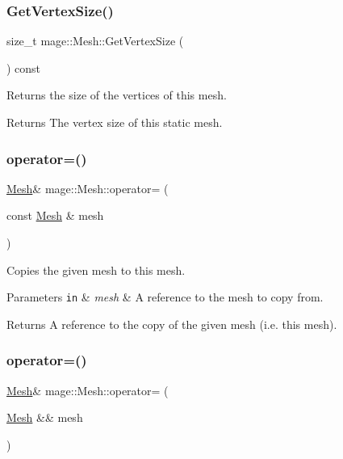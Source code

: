 \subsubsection{\texorpdfstring{Get\+Vertex\+Size()}{GetVertexSize()}}
{\footnotesize\ttfamily size\+\_\+t mage\+::\+Mesh\+::\+Get\+Vertex\+Size (\begin{DoxyParamCaption}{ }\end{DoxyParamCaption}) const}

Returns the size of the vertices of this mesh.

\begin{DoxyReturn}{Returns}
The vertex size of this static mesh. 
\end{DoxyReturn}
\hypertarget{classmage_1_1_mesh_a5baf961af32b379671a59a082492bc5e}{}\label{classmage_1_1_mesh_a5baf961af32b379671a59a082492bc5e} 
\subsubsection{\texorpdfstring{operator=()}{operator=()}\hspace{0.1cm}{\footnotesize\ttfamily [1/2]}}
{\footnotesize\ttfamily \hyperlink{classmage_1_1_mesh}{Mesh}\& mage\+::\+Mesh\+::operator= (\begin{DoxyParamCaption}\item[{const \hyperlink{classmage_1_1_mesh}{Mesh} \&}]{mesh }\end{DoxyParamCaption})\hspace{0.3cm}{\ttfamily [delete]}}

Copies the given mesh to this mesh.


\begin{DoxyParams}[1]{Parameters}
\mbox{\tt in}  & {\em mesh} & A reference to the mesh to copy from. \\
\hline
\end{DoxyParams}
\begin{DoxyReturn}{Returns}
A reference to the copy of the given mesh (i.\+e. this mesh). 
\end{DoxyReturn}
\hypertarget{classmage_1_1_mesh_a28e437196db171b2df1c4bcf3df07a63}{}\label{classmage_1_1_mesh_a28e437196db171b2df1c4bcf3df07a63} 
\subsubsection{\texorpdfstring{operator=()}{operator=()}\hspace{0.1cm}{\footnotesize\ttfamily [2/2]}}
{\footnotesize\ttfamily \hyperlink{classmage_1_1_mesh}{Mesh}\& mage\+::\+Mesh\+::operator= (\begin{DoxyParamCaption}\item[{\hyperlink{classmage_1_1_mesh}{Mesh} \&\&}]{mesh }\end{DoxyParamCaption})\hspace{0.3cm}{\ttfamily [delete]}}

